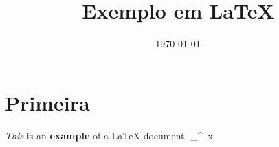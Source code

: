 \documentclass{article}
\title{Exemplo em \LaTeX}
\date{\today}
\begin{document}
    \maketitle
    \section{Primeira}
    \label{fist}

    \emph{This} is an \textbf{example} of a {\LaTeX} document.
    \int_{}^{}  \,x 
    
\end{document}
